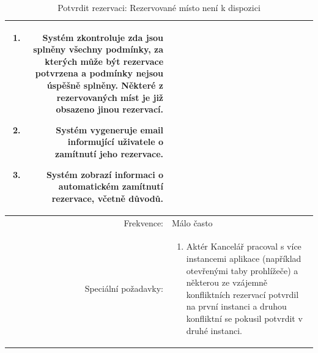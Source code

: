 \begin{table}[ht!]
{\begin{tabular}{| r | p{12cm} |}
\begin{minipage}[t]{0.75\textwidth}
\begin{enumerate}[nosep,after=\strut]
            \item Systém zkontroluje zda jsou splněny všechny podmínky, za kterých může být rezervace potvrzena a podmínky nejsou úspěšně splněny. Některé z rezervovaných míst je již obsazeno jinou rezervací.
            \item Systém vygeneruje email informující uživatele o zamítnutí jeho rezervace.
            \item Systém zobrazí informaci o automatickém zamítnutí rezervace, včetně důvodů.
    	\end{enumerate}
    \end{minipage} \\
    \hline
    Frekvence: & Málo často \\
    \hline
    Speciální požadavky: & 
    \begin{minipage}[t]{0.75\textwidth}
    	\begin{enumerate}[nosep,after=\strut]
    		\item Aktér Kancelář pracoval s více instancemi aplikace (například otevřenými taby prohlížeče) a některou ze vzájemně konfliktních rezervací potvrdil na první instanci a druhou konfliktní se pokusil potvrdit v druhé instanci.
    	\end{enumerate}
  	\end{minipage} \\
    \hline
\end{tabular}}
\caption{Potvrdit rezervaci: Rezervované místo není k dispozici}
\label{table:2}
\end{table}

